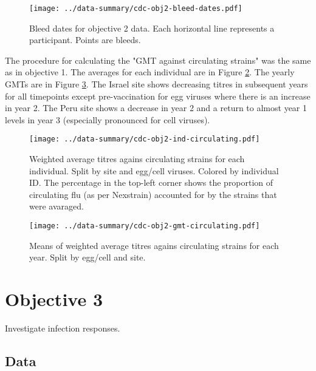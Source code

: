 \documentclass[12pt]{article}
\begin{document}
\begin{figure}
	\texttt{[image: ../data-summary/cdc-obj2-bleed-dates.pdf]}
	\caption{Bleed dates for objective 2 data. Each horizontal line represents a participant. Points are bleeds.}
	\label{fig:cdc-obj2-bleed-dates}
\end{figure}



The procedure for calculating the "GMT against circulating strains" was the same as in objective 1. The averages for each individual are in Figure \ref{fig:cdc-obj2-ind-circulating}. The yearly GMTs are in Figure \ref{fig:cdc-obj2-gmt-circulating}. The Israel site shows decreasing titres in subsequent years for all timepoints except pre-vaccination for egg viruses where there is an increase in year 2. The Peru site shows a decrease in year 2 and a return to almost year 1 levels in year 3 (especially pronounced for cell viruses).

\begin{figure}
	\texttt{[image: ../data-summary/cdc-obj2-ind-circulating.pdf]}
	\caption{Weighted average titres agains circulating strains for each individual. Split by site and egg/cell viruses. Colored by individual ID.  The percentage in the top-left corner shows the proportion of circulating flu (as per Nexstrain) accounted for by the strains that were avaraged.}
	\label{fig:cdc-obj2-ind-circulating}
\end{figure}

\begin{figure}
	\texttt{[image: ../data-summary/cdc-obj2-gmt-circulating.pdf]}
	\caption{Means of weighted average titres agains circulating strains for each year. Split by egg/cell and site.}
	\label{fig:cdc-obj2-gmt-circulating}
\end{figure}

\section{Objective 3}

Investigate infection responses.

\subsection{Data}
\end{document}
